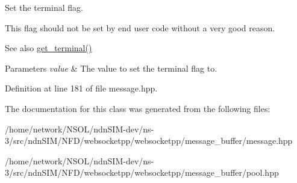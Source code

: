 Set the terminal flag. 

This flag should not be set by end user code without a very good reason.

\begin{DoxySeeAlso}{See also}
\hyperlink{classwebsocketpp_1_1message__buffer_1_1message_a45e39497d283ec38d1360b60a5879e32}{get\+\_\+terminal()}
\end{DoxySeeAlso}

\begin{DoxyParams}{Parameters}
{\em value} & The value to set the terminal flag to. \\
\hline
\end{DoxyParams}


Definition at line 181 of file message.\+hpp.



The documentation for this class was generated from the following files\+:\begin{DoxyCompactItemize}
\item 
/home/network/\+N\+S\+O\+L/ndn\+S\+I\+M-\/dev/ns-\/3/src/ndn\+S\+I\+M/\+N\+F\+D/websocketpp/websocketpp/message\+\_\+buffer/message.\+hpp\item 
/home/network/\+N\+S\+O\+L/ndn\+S\+I\+M-\/dev/ns-\/3/src/ndn\+S\+I\+M/\+N\+F\+D/websocketpp/websocketpp/message\+\_\+buffer/pool.\+hpp\end{DoxyCompactItemize}

